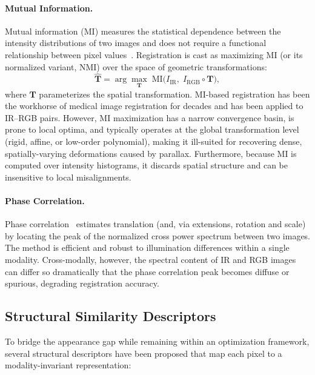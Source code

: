 \paragraph{Mutual Information.}
Mutual information (MI) measures the statistical dependence between the
intensity distributions of two images and does not require a functional
relationship between pixel values~\cite{viola1997alignment,
maes1997multimodality}. Registration is cast as maximizing MI (or its
normalized variant, NMI) over the space of geometric transformations:
\begin{equation}
  \hat{\mathbf{T}} = \arg\max_{\mathbf{T}} \;
    \mathrm{MI}\bigl(I_{\mathrm{IR}},\; I_{\mathrm{RGB}} \circ \mathbf{T}\bigr),
  \label{eq:mi-registration}
\end{equation}
where $\mathbf{T}$ parameterizes the spatial transformation. MI-based
registration has been the workhorse of medical image registration for decades
and has been applied to IR--RGB pairs. However, MI maximization has a narrow
convergence basin, is prone to local optima, and typically operates at the
global transformation level (rigid, affine, or low-order polynomial), making it
ill-suited for recovering dense, spatially-varying deformations caused by
parallax. Furthermore, because MI is computed over intensity histograms, it
discards spatial structure and can be insensitive to local misalignments.

\paragraph{Phase Correlation.}
Phase correlation~\cite{kuglin1975phase} estimates translation (and, via
extensions, rotation and scale) by locating the peak of the normalized cross
power spectrum between two images. The method is efficient and robust to
illumination differences within a single modality. Cross-modally, however, the
spectral content of IR and RGB images can differ so dramatically that the phase
correlation peak becomes diffuse or spurious, degrading registration accuracy.

\subsection{Structural Similarity Descriptors}
\label{subsec:structural}

To bridge the appearance gap while remaining within an optimization framework,
several structural descriptors have been proposed that map each pixel to a
modality-invariant representation:

